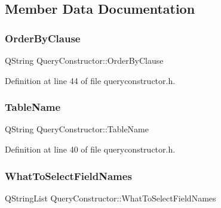 \subsection{Member Data Documentation}
\hypertarget{classQueryConstructor_ad17e64b29d7e1f8fb61756eff17dd099}{}\label{classQueryConstructor_ad17e64b29d7e1f8fb61756eff17dd099} 
\subsubsection{\texorpdfstring{Order\+By\+Clause}{OrderByClause}}
{\footnotesize\ttfamily Q\+String Query\+Constructor\+::\+Order\+By\+Clause\hspace{0.3cm}{\ttfamily [private]}}



Definition at line 44 of file queryconstructor.\+h.

\hypertarget{classQueryConstructor_a228bdb4e6c32a592d96fe0a2562d7220}{}\label{classQueryConstructor_a228bdb4e6c32a592d96fe0a2562d7220} 
\subsubsection{\texorpdfstring{Table\+Name}{TableName}}
{\footnotesize\ttfamily Q\+String Query\+Constructor\+::\+Table\+Name\hspace{0.3cm}{\ttfamily [private]}}



Definition at line 40 of file queryconstructor.\+h.

\hypertarget{classQueryConstructor_a70251e50580cef59cbbee0c4626cf32f}{}\label{classQueryConstructor_a70251e50580cef59cbbee0c4626cf32f} 
\subsubsection{\texorpdfstring{What\+To\+Select\+Field\+Names}{WhatToSelectFieldNames}}
{\footnotesize\ttfamily Q\+String\+List Query\+Constructor\+::\+What\+To\+Select\+Field\+Names\hspace{0.3cm}{\ttfamily [private]}}



